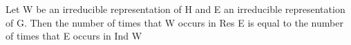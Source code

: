 Let W be an irreducible representation of H and E an irreducible representation of G. Then the number of times that W occurs in Res E is equal to the number of times that E occurs in Ind W
